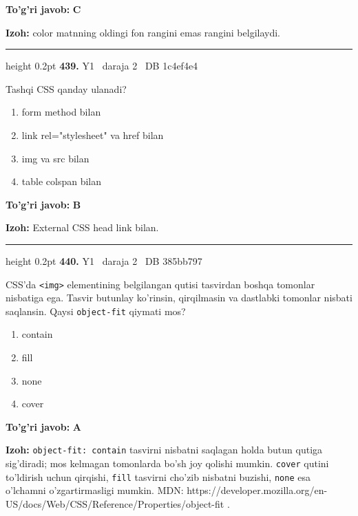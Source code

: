 \documentclass[10pt,a4paper,oneside]{article}
\begin{document}
\begin{tcolorbox}[enhanced,breakable,colback=teal!4,colframe=teal!45!black,boxrule=0.45pt,arc=1.2mm,left=2.8mm,right=2.8mm,top=2mm,bottom=2mm,before skip=2mm,after skip=2mm]
\textbf{\color{teal}To'g'ri javob:} \textbf{C}
\par\smallskip
\textbf{Izoh:} color matnning oldingi fon rangini emas rangini belgilaydi.
\end{tcolorbox}
\vspace{2mm}\hrule height 0.2pt \vspace{4mm}
\hypertarget{q439}{\textbf{\color{ink}439.}}  {\color{muted}\scriptsize Y1 \textbullet\ daraja 2 \textbullet\ DB 1c4ef4e4}
\par
Tashqi CSS qanday ulanadi?
\begin{enumerate}[label=\Alph*),leftmargin=9mm]
\item form method bilan
\item link rel="stylesheet" va href bilan
\item img va src bilan
\item table colspan bilan
\end{enumerate}
\begin{tcolorbox}[enhanced,breakable,colback=teal!4,colframe=teal!45!black,boxrule=0.45pt,arc=1.2mm,left=2.8mm,right=2.8mm,top=2mm,bottom=2mm,before skip=2mm,after skip=2mm]
\textbf{\color{teal}To'g'ri javob:} \textbf{B}
\par\smallskip
\textbf{Izoh:} External CSS head link bilan.
\end{tcolorbox}
\vspace{2mm}\hrule height 0.2pt \vspace{4mm}
\hypertarget{q440}{\textbf{\color{ink}440.}}  {\color{muted}\scriptsize Y1 \textbullet\ daraja 2 \textbullet\ DB 385bb797}
\par
CSS'da \texttt{\textless{}img\textgreater{}} elementining belgilangan qutisi tasvirdan boshqa tomonlar nisbatiga ega. Tasvir butunlay ko'rinsin, qirqilmasin va dastlabki tomonlar nisbati saqlansin. Qaysi \texttt{object-fit} qiymati mos?
\begin{enumerate}[label=\Alph*),leftmargin=9mm]
\item contain
\item fill
\item none
\item cover
\end{enumerate}
\begin{tcolorbox}[enhanced,breakable,colback=teal!4,colframe=teal!45!black,boxrule=0.45pt,arc=1.2mm,left=2.8mm,right=2.8mm,top=2mm,bottom=2mm,before skip=2mm,after skip=2mm]
\textbf{\color{teal}To'g'ri javob:} \textbf{A}
\par\smallskip
\textbf{Izoh:} \texttt{object-fit: contain} tasvirni nisbatni saqlagan holda butun qutiga sig'diradi; mos kelmagan tomonlarda bo'sh joy qolishi mumkin. \texttt{cover} qutini to'ldirish uchun qirqishi, \texttt{fill} tasvirni cho'zib nisbatni buzishi, \texttt{none} esa o'lchamni o'zgartirmasligi mumkin. MDN: https://developer.mozilla.org/en-US/docs/Web/CSS/Reference/Properties/object-fit .
\end{tcolorbox}
\end{document}
